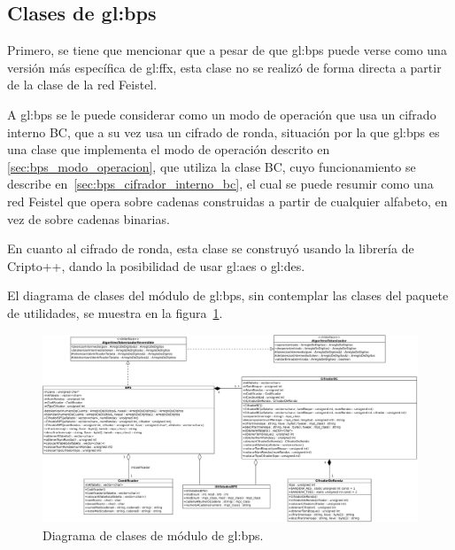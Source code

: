 %
%
%

\subsection{Clases de \texorpdfstring{\acrshort{gl:bps}}{BPS}}

Primero, se tiene que mencionar que a pesar de que \gls{gl:bps} puede verse como
una versión más específica de \gls{gl:ffx}, esta clase no se realizó de forma
directa a partir de la clase de la red Feistel.

A \gls{gl:bps} se le puede considerar como un modo de operación que usa un
cifrado interno BC, que a su vez usa un cifrado de ronda, situación por la que
\gls{gl:bps} es una clase que implementa el modo de operación descrito en
\ref{sec:bps_modo_operacion}, que utiliza la clase BC, cuyo funcionamiento se
describe en~\ref{sec:bps_cifrador_interno_bc}, el cual se puede resumir como
una red Feistel que opera sobre cadenas construidas a partir de cualquier
alfabeto, en vez de sobre cadenas binarias.

En cuanto al cifrado de ronda, esta clase se construyó usando la librería de
Cripto++, dando la posibilidad de usar \gls{gl:aes} o \gls{gl:des}.


El diagrama de clases del módulo de \gls{gl:bps}, sin contemplar las clases del
paquete de utilidades, se muestra en la figura~\ref{diagrama_clases_bps}.

\begin{figure}
  \begin{center}
    \includegraphics[width=1.0\linewidth]{diagramas/bps.png}
    \caption{Diagrama de clases de módulo de \gls{gl:bps}.}
    \label{diagrama_clases_bps}
  \end{center}
\end{figure}
